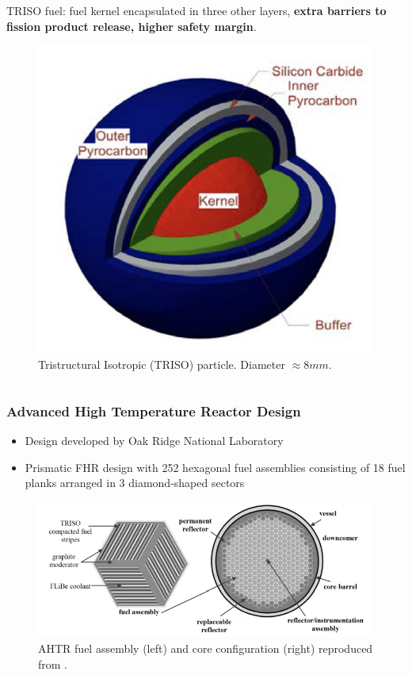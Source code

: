 \begin{frame}
\begin{columns}
{\begin{column}{0.5\textwidth}
            \vspace{0.2cm}
            \acrfull{TRISO} fuel: fuel kernel encapsulated in three other layers, 
            \textbf{extra barriers to fission product release, higher safety margin}. 
            \vspace{-0.1cm}
            \begin{figure}[htbp!]
                \includegraphics[width=0.45\linewidth]{../docs/figures/ahtr-triso.png}
                \caption{Tristructural Isotropic (TRISO) 
                particle. Diameter $\approx 8mm$.}
            \end{figure}
        \end{column}}
    \end{columns}
        \end{frame}

    \begin{frame}
    \frametitle{Advanced High Temperature Reactor Design}
        \begin{itemize}
        \item Design developed by Oak Ridge National Laboratory
        \item Prismatic FHR design with 252 hexagonal fuel assemblies consisting of 
        18 fuel planks arranged in 3 diamond-shaped sectors
        \end{itemize}
    
    \vspace{0.2cm}
    \begin{figure}[]
        \centering
        \includegraphics[width=\linewidth]{../docs/figures/ahtr.png} 
        \caption{\acrlong{AHTR} fuel assembly (left) and core configuration (right) 
        reproduced from \cite{ramey_monte_2018}.}
        \label{fig:ahtr}
    \end{figure}
    \end{frame}

